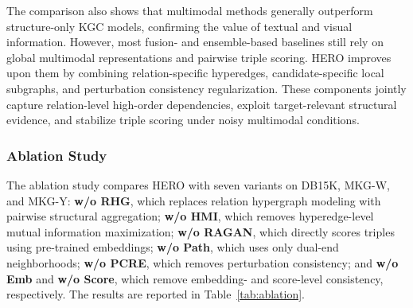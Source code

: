 \documentclass[a4paper,fleqn]{cas-sc}
\begin{document}
The comparison also shows that multimodal methods generally outperform structure-only KGC models, confirming the value of textual and visual information. However, most fusion- and ensemble-based baselines still rely on global multimodal representations and pairwise triple scoring. HERO improves upon them by combining relation-specific hyperedges, candidate-specific local subgraphs, and perturbation consistency regularization. These components jointly capture relation-level high-order dependencies, exploit target-relevant structural evidence, and stabilize triple scoring under noisy multimodal conditions.


\subsubsection{Ablation Study}

The ablation study compares HERO with seven variants on DB15K, MKG-W, and MKG-Y: \textbf{w/o RHG}, which replaces relation hypergraph modeling with pairwise structural aggregation; \textbf{w/o HMI}, which removes hyperedge-level mutual information maximization; \textbf{w/o RAGAN}, which directly scores triples using pre-trained embeddings; \textbf{w/o Path}, which uses only dual-end neighborhoods; \textbf{w/o PCRE}, which removes perturbation consistency; and \textbf{w/o Emb} and \textbf{w/o Score}, which remove embedding- and score-level consistency, respectively. The results are reported in Table~\ref{tab:ablation}.
\end{document}
